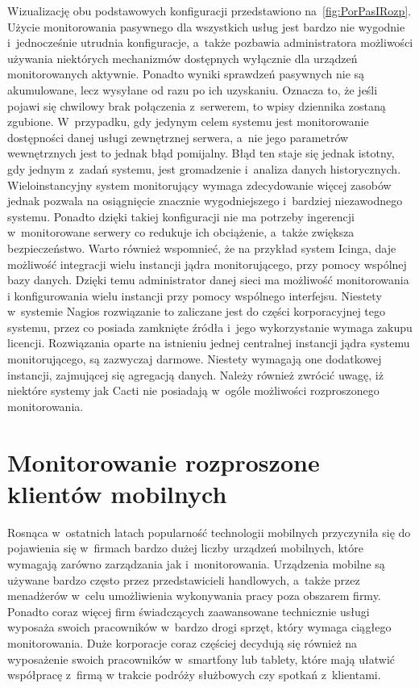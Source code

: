 Wizualizację obu podstawowych konfiguracji przedstawiono
na~\ref{fig:PorPasIRozp}. Użycie monitorowania pasywnego dla
wszystkich usług jest bardzo nie wygodnie i~jednocześnie utrudnia
konfiguracje, a~także pozbawia administratora możliwości używania
niektórych mechanizmów dostępnych wyłącznie dla urządzeń
monitorowanych aktywnie. Ponadto wyniki sprawdzeń pasywnych nie są
akumulowane, lecz wysyłane od razu po ich uzyskaniu. Oznacza to, że
jeśli pojawi się chwilowy brak połączenia z~serwerem, to wpisy
dziennika zostaną zgubione. W~przypadku, gdy jedynym celem systemu
jest monitorowanie dostępności danej usługi zewnętrznej serwera, a~nie
jego parametrów wewnętrznych jest to jednak błąd pomijalny. Błąd ten
staje się jednak istotny, gdy jednym z~zadań systemu, jest gromadzenie
i~analiza danych historycznych. Wieloinstancyjny system monitorujący
wymaga zdecydowanie więcej zasobów jednak pozwala na osiągnięcie
znacznie wygodniejszego i~bardziej niezawodnego systemu. Ponadto
dzięki takiej konfiguracji nie ma potrzeby ingerencji w~monitorowane
serwery co redukuje ich obciążenie, a~także zwiększa
bezpieczeństwo. Warto również wspomnieć, że na przykład system Icinga,
daje możliwość integracji wielu instancji jądra monitorującego, przy
pomocy wspólnej bazy danych. Dzięki temu administrator danej sieci ma
możliwość monitorowania i konfigurowania wielu instancji przy pomocy
wspólnego interfejsu. Niestety w~systemie Nagios rozwiązanie to
zaliczane jest do części korporacyjnej tego systemu, przez co posiada
zamknięte źródła i~jego wykorzystanie wymaga zakupu
licencji. Rozwiązania oparte na istnieniu jednej centralnej instancji
jądra systemu monitorującego, są zazwyczaj darmowe. Niestety wymagają
one dodatkowej instancji, zajmującej się agregacją danych. Należy
również zwrócić uwagę, iż niektóre systemy jak Cacti nie posiadają
w~ogóle możliwości rozproszonego monitorowania.

\section[Monitorowanie rozproszone][Monitorowanie rozproszone klientów
mobilnych]{Monitorowanie rozproszone klientów mobilnych}

Rosnąca w~ostatnich latach popularność technologii mobilnych
przyczyniła się do pojawienia się w~firmach bardzo dużej liczby
urządzeń mobilnych, które wymagają zarówno zarządzania jak
i~monitorowania. Urządzenia mobilne są używane bardzo często przez
przedstawicieli handlowych, a~także przez menadżerów w~celu
umożliwienia wykonywania pracy poza obszarem firmy. Ponadto coraz
więcej firm świadczących zaawansowane technicznie usługi wyposaża
swoich pracowników w~bardzo drogi sprzęt, który wymaga ciągłego
monitorowania. Duże korporacje coraz częściej decydują się również na
wyposażenie swoich pracowników w~smartfony lub tablety, które mają
ułatwić współpracę z~firmą w trakcie podróży służbowych czy spotkań
z~klientami.

